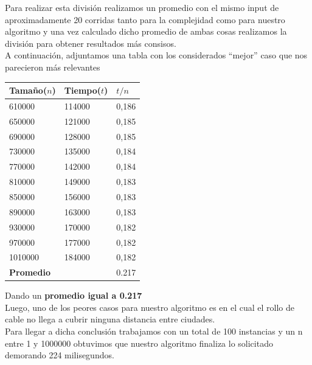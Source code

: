  Para realizar esta divisi\'on realizamos un promedio con el mismo input de aproximadamente 20 corridas
tanto para la complejidad como para nuestro algoritmo y una vez calculado dicho promedio de ambas cosas realizamos la divisi\'on para
obtener resultados m\'as consisos.\\ 

  
  
A continuaci\'on, adjuntamos una tabla con los considerados “mejor” caso que nos parecieron m\'as relevantes

\begin{table}[H]

    \begin{tabular}{ | l | l |l |}
    \hline
		Tamaño($n$) & Tiempo($t$) & \textbf{$t /n$}  \\ \hline
610000 & 114000 & 0,186 \\ \hline
650000 & 121000 & 0,185 \\ \hline
690000 & 128000 & 0,185 \\ \hline
730000 & 135000 & 0,184 \\ \hline
770000 & 142000 & 0,184 \\ \hline
810000 & 149000 & 0,183 \\ \hline
850000 & 156000 & 0,183 \\ \hline
890000 & 163000 & 0,183 \\ \hline
930000 & 170000 & 0,182 \\ \hline
970000 & 177000 & 0,182 \\ \hline
1010000 & 184000 & 0,182 \\ \hline

\textbf{Promedio} & & 0.217 \\ \hline

    \end{tabular}
\end{table}

Dando un \textbf{promedio igual a 0.217 }\\

Luego, uno de los peores casos para nuestro algoritmo es en el cual el rollo de cable no llega a cubrir ninguna distancia entre ciudades.\\

Para llegar a dicha conclusi\'on trabajamos con un total de 100 instancias y un n entre 1 y 1000000 obtuvimos que nuestro
algoritmo finaliza lo solicitado demorando 224 milisegundos.\\

